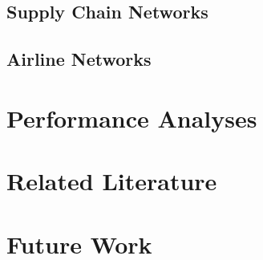\documentclass[twocolumn,showpacs,preprintnumbers,amsmath,amssymb]{revtex4}
\begin{document}
\subsection{Supply Chain Networks}
\subsection{Airline Networks}

\section{Performance Analyses}



\section{Related Literature}

\section{Future Work}
%
%
%
\end{document}
